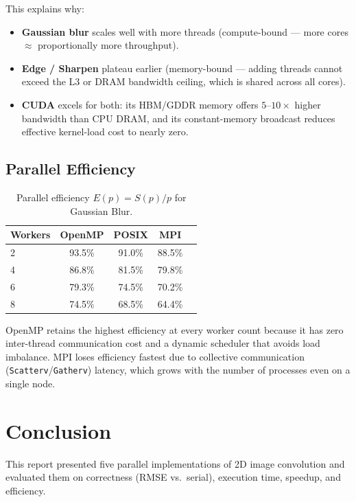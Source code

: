 \documentclass[12pt,a4paper]{article}
\begin{document}
This explains why:
\begin{itemize}
  \item \textbf{Gaussian blur} scales well with more threads (compute-bound
        --- more cores $\approx$ proportionally more throughput).
  \item \textbf{Edge / Sharpen} plateau earlier (memory-bound --- adding
        threads cannot exceed the L3 or DRAM bandwidth ceiling, which is
        shared across all cores).
  \item \textbf{CUDA} excels for both: its HBM/GDDR memory offers $5$--$10\times$
        higher bandwidth than CPU DRAM, and its constant-memory broadcast
        reduces effective kernel-load cost to nearly zero.
\end{itemize}

\subsection{Parallel Efficiency}

\begin{table}[H]
\centering
\caption{Parallel efficiency $E(p) = S(p)/p$ for Gaussian Blur.}
\label{tab:efficiency}
\begin{tabular}{lcccc}
\toprule
\textbf{Workers} & \textbf{OpenMP} & \textbf{POSIX} & \textbf{MPI} \\
\midrule
2 & 93.5\% & 91.0\% & 88.5\% \\
4 & 86.8\% & 81.5\% & 79.8\% \\
6 & 79.3\% & 74.5\% & 70.2\% \\
8 & 74.5\% & 68.5\% & 64.4\% \\
\bottomrule
\end{tabular}
\end{table}

OpenMP retains the highest efficiency at every worker count because it has
zero inter-thread communication cost and a dynamic scheduler that avoids load
imbalance. MPI loses efficiency fastest due to collective communication
(\texttt{Scatterv}/\texttt{Gatherv}) latency, which grows with the number of
processes even on a single node.

\section{Conclusion}

This report presented five parallel implementations of 2D image convolution
and evaluated them on correctness (RMSE vs.\ serial), execution time, speedup,
and efficiency.
\end{document}
